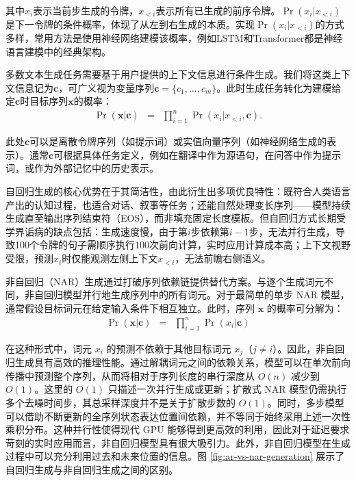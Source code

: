 \documentclass[UTF8,a4paper,zihao=-4,oneside,openany]{ctexbook}
\begin{document}
\noindent 其中$x_i$表示当前步生成的令牌，$x_{<i}$表示所有已生成的前序令牌。$\Pr(x_i|x_{<i})$是下一令牌的条件概率，体现了从左到右生成的本质。实现$\Pr(x_i|x_{<i})$的方式多样，常用方法是使用神经网络建模该概率，例如LSTM和Transformer都是神经语言建模中的经典架构。

多数文本生成任务需要基于用户提供的上下文信息进行条件生成。我们将这类上下文信息记为$\mathbf{c}$，可广义视为变量序列$\mathbf{c} = \{c_1,...,c_m\}$。此时生成任务转化为建模给定$\mathbf{c}$时目标序列$\mathbf{x}$的概率：
\begin{eqnarray}
\Pr(\mathbf{x}|\mathbf{c}) & = & \prod_{i=1}^{n} \Pr(x_i|x_{<i},\mathbf{c}).
\end{eqnarray}

\noindent 此处$\mathbf{c}$可以是离散令牌序列（如提示词）或实值向量序列（如神经网络生成的表示）。通常$\mathbf{c}$可根据具体任务定义，例如在翻译中作为源语句，在问答中作为提示词，或作为外部记忆中的历史表示。

自回归生成的核心优势在于其简洁性，由此衍生出多项优良特性：既符合人类语言产出的认知过程，也适合对话、叙事等任务；还能自然处理变长序列——模型持续生成直至输出序列结束符（EOS），而非填充固定长度模板。但自回归方式长期受学界诟病的缺点包括：生成速度慢，由于第$i$步依赖第$i-1$步，无法并行生成，导致100个令牌的句子需顺序执行100次前向计算，实时应用计算成本高；上下文视野受限，预测$x_i$时仅能观测左侧上下文$x_{<i}$，无法前瞻右侧语义。

非自回归（NAR）生成通过打破序列依赖链提供替代方案\citep{gu-etal:2018non}。与逐个生成词元不同，非自回归模型并行地生成序列中的所有词元。对于最简单的单步 NAR 模型，通常假设目标词元在给定输入条件下相互独立。此时，序列 $\mathbf{x}$ 的概率可分解为：
\begin{eqnarray}
\Pr(\mathbf{x}|\mathbf{c}) & = & \prod_{i=1}^{n} \Pr(x_i|\mathbf{c})
\end{eqnarray}

在这种形式中，词元 $x_i$ 的预测不依赖于其他目标词元 $x_{j}$（$j \neq i$）。因此，非自回归生成具有高效的推理性能。通过解耦词元之间的依赖关系，模型可以在单次前向传播中预测整个序列，从而将相对于序列长度的串行深度从 $O(n)$ 减少到 $O(1)$。这里的 $O(1)$ 只描述一次并行生成或更新；扩散式 NAR 模型仍需执行多个去噪时间步，其总采样深度并不是关于扩散步数的 $O(1)$。同时，多步模型可以借助不断更新的全序列状态表达位置间依赖，并不等同于始终采用上述一次性乘积分布。这种并行性使得现代 GPU 能够得到更高效的利用，因此对于延迟要求苛刻的实时应用而言，非自回归模型具有很大吸引力。此外，非自回归模型在生成过程中可以充分利用过去和未来位置的信息。图 \ref{fig:ar-vs-nar-generation} 展示了自回归生成与非自回归生成之间的区别。
\end{document}
